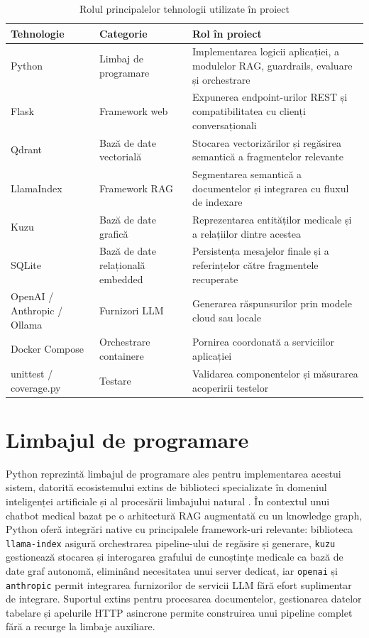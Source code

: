 \documentclass[12pt, a4paper, oneside, romanian]{teza-upb}
\begin{document}
\begin{table}[h]
\centering
\begin{tabular}{|p{3cm}|p{4cm}|p{6cm}|}
\hline
\textbf{Tehnologie} & \textbf{Categorie} & \textbf{Rol în proiect} \\
\hline
Python & Limbaj de programare & Implementarea logicii aplicației, a modulelor RAG, guardrails, evaluare și orchestrare \\
\hline
Flask & Framework web & Expunerea endpoint-urilor REST și compatibilitatea cu clienți conversaționali \\
\hline
Qdrant & Bază de date vectorială & Stocarea vectorizărilor și regăsirea semantică a fragmentelor relevante \\
\hline
LlamaIndex & Framework RAG & Segmentarea semantică a documentelor și integrarea cu fluxul de indexare \\
\hline
Kuzu & Bază de date grafică & Reprezentarea entităților medicale și a relațiilor dintre acestea \\
\hline
SQLite & Bază de date relațională embedded & Persistența mesajelor finale și a referințelor către fragmentele recuperate \\
\hline
OpenAI / Anthropic / Ollama & Furnizori LLM & Generarea răspunsurilor prin modele cloud sau locale \\
\hline
Docker Compose & Orchestrare containere & Pornirea coordonată a serviciilor aplicației \\
\hline
unittest / coverage.py & Testare & Validarea componentelor și măsurarea acoperirii testelor \\
\hline
\end{tabular}
\caption{Rolul principalelor tehnologii utilizate în proiect}
\end{table}

\section{Limbajul de programare}

Python reprezintă limbajul de programare ales pentru implementarea acestui sistem,
datorită ecosistemului extins de biblioteci specializate în domeniul inteligenței
artificiale și al procesării limbajului natural \cite{srinath2017python, llm_review_2024}. În contextul unui
chatbot medical bazat pe o arhitectură RAG augmentată cu un knowledge graph,
Python oferă integrări native cu principalele framework-uri relevante: biblioteca
\texttt{llama-index} asigură orchestrarea pipeline-ului de regăsire și generare,
\texttt{kuzu} gestionează stocarea și interogarea grafului de cunoștințe medicale
ca bază de date graf autonomă, eliminând necesitatea unui server dedicat, iar
\texttt{openai} și \texttt{anthropic} permit integrarea furnizorilor de servicii
LLM fără efort suplimentar de integrare. Suportul extins pentru procesarea
documentelor, gestionarea datelor tabelare și apelurile HTTP asincrone permite
construirea unui pipeline complet fără a recurge la limbaje auxiliare.
\end{document}
